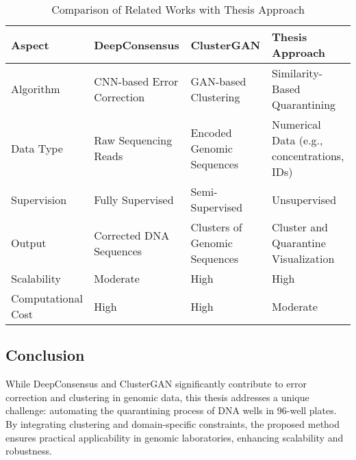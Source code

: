 \begin{table}[h]
\centering
\caption{Comparison of Related Works with Thesis Approach}
\label{tab:comparison}
\begin{tabular}{|l|l|l|l|}
\hline
\textbf{Aspect}              & \textbf{DeepConsensus}               & \textbf{ClusterGAN}                  & \textbf{Thesis Approach}             \\ \hline
Algorithm                    & CNN-based Error Correction           & GAN-based Clustering                 & Similarity-Based Quarantining        \\ \hline
Data Type                    & Raw Sequencing Reads                 & Encoded Genomic Sequences            & Numerical Data (e.g., concentrations, IDs) \\ \hline
Supervision                  & Fully Supervised                     & Semi-Supervised                      & Unsupervised                        \\ \hline
Output                       & Corrected DNA Sequences              & Clusters of Genomic Sequences        & Cluster and Quarantine Visualization  \\ \hline
Scalability                  & Moderate                             & High                                 & High                                 \\ \hline
Computational Cost           & High                                 & High                                 & Moderate                             \\ \hline
\end{tabular}
\end{table}

\subsection{Conclusion}

While DeepConsensus and ClusterGAN significantly contribute to error correction and clustering in genomic data, this thesis addresses a unique challenge: automating the quarantining process of DNA wells in 96-well plates. By integrating clustering and domain-specific constraints, the proposed method ensures practical applicability in genomic laboratories, enhancing scalability and robustness.